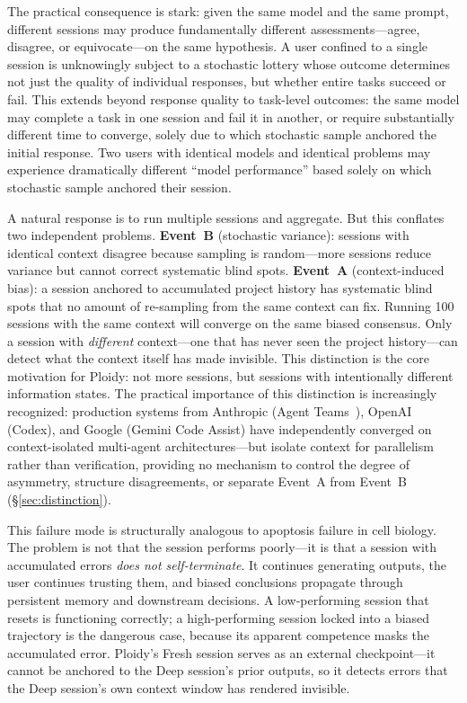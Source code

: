\documentclass[11pt]{article}
\begin{document}
The practical consequence is stark: given the same model and the same prompt, different sessions may produce fundamentally different assessments---agree, disagree, or equivocate---on the same hypothesis. A user confined to a single session is unknowingly subject to a stochastic lottery whose outcome determines not just the quality of individual responses, but whether entire tasks succeed or fail. This extends beyond response quality to task-level outcomes: the same model may complete a task in one session and fail it in another, or require substantially different time to converge, solely due to which stochastic sample anchored the initial response. Two users with identical models and identical problems may experience dramatically different ``model performance'' based solely on which stochastic sample anchored their session.

A natural response is to run multiple sessions and aggregate. But this conflates two independent problems. \textbf{Event~B} (stochastic variance): sessions with identical context disagree because sampling is random---more sessions reduce variance but cannot correct systematic blind spots. \textbf{Event~A} (context-induced bias): a session anchored to accumulated project history has systematic blind spots that no amount of re-sampling from the same context can fix. Running 100 sessions with the same context will converge on the same biased consensus. Only a session with \emph{different} context---one that has never seen the project history---can detect what the context itself has made invisible. This distinction is the core motivation for Ploidy: not more sessions, but sessions with intentionally different information states. The practical importance of this distinction is increasingly recognized: production systems from Anthropic (Agent Teams~\citep{anthropic2026agentteams}), OpenAI (Codex), and Google (Gemini Code Assist) have independently converged on context-isolated multi-agent architectures---but isolate context for parallelism rather than verification, providing no mechanism to control the degree of asymmetry, structure disagreements, or separate Event~A from Event~B (\S\ref{sec:distinction}).

This failure mode is structurally analogous to apoptosis failure in cell biology. The problem is not that the session performs poorly---it is that a session with accumulated errors \emph{does not self-terminate}. It continues generating outputs, the user continues trusting them, and biased conclusions propagate through persistent memory and downstream decisions. A low-performing session that resets is functioning correctly; a high-performing session locked into a biased trajectory is the dangerous case, because its apparent competence masks the accumulated error. Ploidy's Fresh session serves as an external checkpoint---it cannot be anchored to the Deep session's prior outputs, so it detects errors that the Deep session's own context window has rendered invisible.
\end{document}
